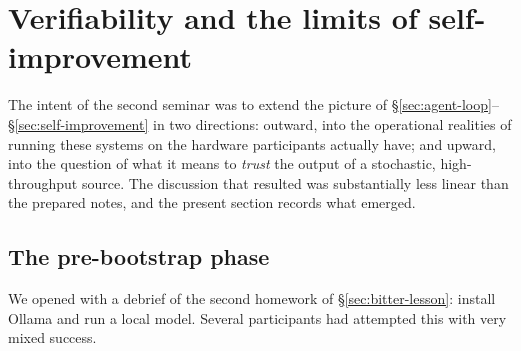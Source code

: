 %

\section{Verifiability and the limits of self-improvement}%
\label{sec:verification}

The intent of the second seminar was to extend the picture of
\S\ref{sec:agent-loop}--\S\ref{sec:self-improvement} in two
directions: outward, into the operational realities of running
these systems on the hardware participants actually have; and
upward, into the question of what it means to \emph{trust} the
output of a stochastic, high-throughput source.  The
discussion that resulted was substantially less linear than
the prepared notes, and the present section records what
emerged.

\subsection{The pre-bootstrap phase}\label{sec:prebootstrap}

We opened with a debrief of the second homework of
\S\ref{sec:bitter-lesson}: install Ollama and run a local
model.  Several participants had attempted this with very
mixed success.

